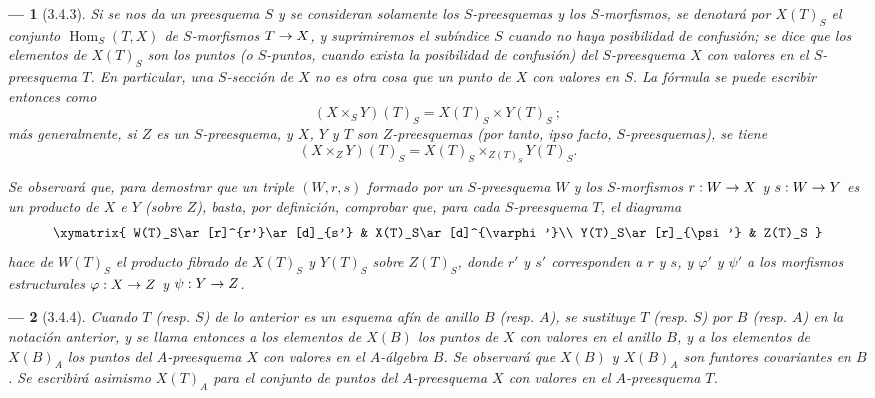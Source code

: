 \documentclass[oneside]{amsart}
\theoremstyle{ega-env-style}
\newtheorem*{env}{---}
\theoremstyle{ega-thm-env-style}
\theoremstyle{ega-defn-env-style}
\renewcommand{\to}{\mathchoice{\longrightarrow}{\rightarrow}{\rightarrow}{\rightarrow}}
\let\EGAOriginalLabel\label
\renewcommand{\label}[1]{\phantomsection\EGAOriginalLabel{#1}}
\begin{document}
\begin{env}[3.4.3]
\label{I.3.4.3}
Si se nos da un preesquema $S$ y se consideran solamente los $S$-preesquemas y los $S$-morfismos,
se denotará por $X(T)_S$ el conjunto $\operatorname{Hom}_S(T,X)$ de $S$-morfismos $T\to X$, y suprimiremos
el subíndice $S$ cuando no haya posibilidad de confusión; se dice que los elementos de $X(T)_S$
son los \emph{puntos} (o \emph{$S$-puntos}, cuando exista la posibilidad de confusión)
\emph{del $S$-preesquema $X$ con valores en el $S$-preesquema $T$}. En particular, una
\emph{$S$-sección} de $X$ no es otra cosa que un \emph{punto de $X$ con valores en $S$}. La
fórmula  se puede escribir entonces como
\label{I.3.4.3.1-fr}
\[
  (X\times_S Y)(T)_S=X(T)_S\times Y(T)_S~;
  \tag{3.4.3.1}
\]
más generalmente, si $Z$ es un $S$-preesquema, y $X$, $Y$ y $T$ son $Z$-preesquemas (por tanto,
\emph{ipso facto}, $S$-preesquemas), se tiene
\label{I.3.4.3.2-fr}
\[
  (X\times_Z Y)(T)_S=X(T)_S\times_{Z(T)_S}Y(T)_S.
  \tag{3.4.3.2}
\]

Se observará que, para demostrar que un triple $(W,r,s)$ formado por un $S$-preesquema $W$ y
los $S$-morfismos $r:W\to X$ y $s:W\to Y$ es un producto de $X$ e $Y$ (sobre $Z$), basta, por
definición, comprobar que, para \emph{cada $S$-preesquema $T$}, el diagrama
\label{I.3.4.3.product-diagram-fr}
\[
  \xymatrix{
    W(T)_S\ar[r]^{r'}\ar[d]_{s'} & X(T)_S\ar[d]^{\varphi'}\\
    Y(T)_S\ar[r]_{\psi'} & Z(T)_S
  }
\]
hace de $W(T)_S$ el producto fibrado de $X(T)_S$ y $Y(T)_S$ sobre $Z(T)_S$, donde $r'$ y $s'$
corresponden a $r$ y $s$, y $\varphi'$ y $\psi'$ a los morfismos estructurales $\varphi:X\to Z$ y
$\psi:Y\to Z$.
\end{env}

\begin{env}[3.4.4]
\label{I.3.4.4}
Cuando $T$ (resp. $S$) de lo anterior es un esquema afín de anillo $B$ (resp. $A$), se sustituye
$T$ (resp. $S$) por $B$ (resp. $A$) en la notación anterior, y se llama entonces a los elementos de
$X(B)$ los \emph{puntos de $X$ con valores en el anillo $B$}, y a los elementos de $X(B)_A$ los
\emph{puntos del $A$-preesquema $X$ con valores en el $A$-álgebra $B$}. Se observará que
$X(B)$ y $X(B)_A$ son funtores \emph{covariantes} en $B$. Se escribirá asimismo $X(T)_A$ para el
conjunto de puntos del $A$-preesquema $X$ con valores en el $A$-preesquema $T$.
\end{env}
\end{document}
